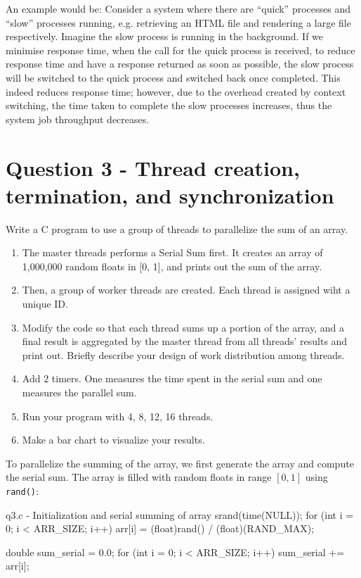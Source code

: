\documentclass[../main.tex]{subfiles}
\begin{document}
An example would be: Consider a system where there are “quick” processes and “slow” processes running, e.g. retrieving an HTML file and rendering a large file respectively. Imagine the slow process is running in the background. If we minimise response time, when the call for the quick process is received, to reduce response time and have a response returned as soon as possible, the slow process will be switched to the quick process and switched back once completed. This indeed reduces response time; however, due to the overhead created by context switching, the time taken to complete the slow processes increases, thus the system job throughput decreases.

\newpage

\section{Question 3 - Thread creation, termination, and synchronization}

Write a C program to use a group of threads to parallelize the sum of an array.

\begin{enumerate}
    \item The master threads performs a Serial Sum first. It creates an array of 1,000,000 random floats in [0, 1], and prints out the sum of the array.
    \item Then, a group of worker threads are created. Each thread is assigned wiht a unique ID.
    \item Modify the code so that each thread sums up a portion of the array, and a final result is aggregated by the master thread from all threads' results and print out. Briefly describe your design of work distribution among threads.
    \item Add 2 timers. One measures the time spent in the serial sum and one measures the parallel sum.
    \item Run your program with 4, 8, 12, 16 threads.
    \item Make a bar chart to visualize your results.
\end{enumerate}

\solution

To parallelize the summing of the array, we first generate the array and compute the serial sum. The array is filled with random floats in range $[0, 1]$ using \lstinline{rand()}:

\begin{cppcode}{q3.c - Initialization and serial summing of array}
srand(time(NULL));
for (int i = 0; i < ARR_SIZE; i++)
{
    arr[i] = (float)rand() / (float)(RAND_MAX);
}

double sum_serial = 0.0;
for (int i = 0; i < ARR_SIZE; i++)
{
    sum_serial += arr[i];
}
\end{cppcode}
\end{document}

